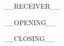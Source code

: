 \documentclass
[
  fontsize=12pt,
  paper=a4,
  parskip=half,
  enlargefirstpage=on,    %
  fromalign=right,        %
  fromphone=off,           %
  fromrule=aftername,     %
  addrfield=on,           %
  backaddress=on,         %
  subject=beforeopening,  %
  locfield=narrow,        %
  foldmarks=on,           %
  numericaldate=on,
  headsepline=on,	%
  firstfoot=on,
]{scrlttr2}
\begin{document}
\begin{letter}{__RECEIVER__}
\opening{__OPENING__}

\blindtext

\Blindtext

\closing{__CLOSING__}
\end{letter}
\end{document}
